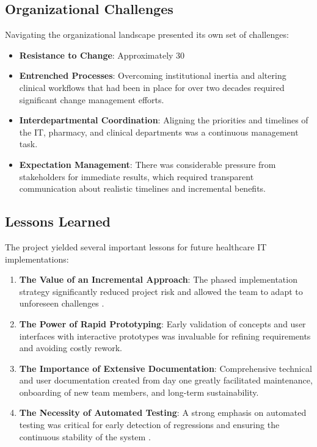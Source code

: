 \subsection{Organizational Challenges}

Navigating the organizational landscape presented its own set of challenges:
\begin{itemize}
    \item \textbf{Resistance to Change}: Approximately 30%
    \item \textbf{Entrenched Processes}: Overcoming institutional inertia and altering clinical workflows that had been in place for over two decades required significant change management efforts.
    \item \textbf{Interdepartmental Coordination}: Aligning the priorities and timelines of the IT, pharmacy, and clinical departments was a continuous management task.
    \item \textbf{Expectation Management}: There was considerable pressure from stakeholders for immediate results, which required transparent communication about realistic timelines and incremental benefits.
\end{itemize}

\subsection{Lessons Learned}

The project yielded several important lessons for future healthcare IT implementations:
\begin{enumerate}
    \item \textbf{The Value of an Incremental Approach}: The phased implementation strategy significantly reduced project risk and allowed the team to adapt to unforeseen challenges \cite{may2013}.
    \item \textbf{The Power of Rapid Prototyping}: Early validation of concepts and user interfaces with interactive prototypes was invaluable for refining requirements and avoiding costly rework.
    \item \textbf{The Importance of Extensive Documentation}: Comprehensive technical and user documentation created from day one greatly facilitated maintenance, onboarding of new team members, and long-term sustainability.
    \item \textbf{The Necessity of Automated Testing}: A strong emphasis on automated testing was critical for early detection of regressions and ensuring the continuous stability of the system \cite{fowler2018}.
\end{enumerate}

